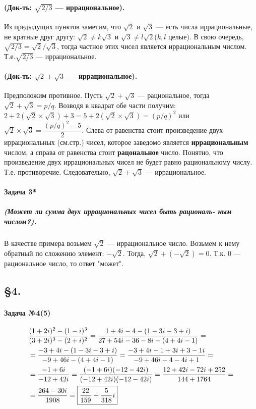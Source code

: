 \documentclass[a4paper,12pt]{report} %
\begin{document}
\paragraph{(Док-ть: $ \sqrt{2/3} $ --- иррациональное).}
Из предыдущих пунктов заметим, что $ \sqrt{2} $ и
$ \sqrt{3} $ --- есть числа иррациональные, 
не кратные друг другу: $ \sqrt{2} \ne k\sqrt{3} $ и
$ \sqrt{3} \ne l\sqrt{2} $($k, l $ целые).
В свою очередь, $ \sqrt{2/3}=\sqrt{2}/\sqrt{3} $, тогда
частное этих чисел является иррациональным числом.
Т.е.$ \sqrt{2/3} $ --- иррациональное.

\paragraph{(Док-ть: $ \sqrt{2} + \sqrt{3} $ --- иррациональное).}
Предположим противное.
Пусть $ \sqrt{2} + \sqrt{3} $ --- рациональное, тогда
$ \sqrt{2} + \sqrt{3} = p/q $. Возводя в квадрат обе части получим: 
$ 2 + 2(\sqrt{2} \times \sqrt{3}) + 3 = 
5 + 2(\sqrt{2} \times \sqrt{3}) = (p/q)^2 $ или 
$ \sqrt{2} \times \sqrt{3} = \dfrac{(p/q)^2 - 5}{2} $.  
Слева от равенства стоит произведение двух иррациональных (см.стр.\pageref{sqrt2}) чисел, которое
заведомо является \textbf{иррациональным} числом,
а справа от равенства стоит \textbf{рацональное} число.
Понятно, что произведение двух иррациональных чисел 
не будет равно рациональному числу. Т.е. противоречие.
Следовательно, $ \sqrt{2} + \sqrt{3} $ --- иррациональное.

\paragraph{Задача 3*}
\subparagraph{(Может ли сумма двух иррациональных чисел быть рациональ-	ным числом?).} 
В качестве примера возьмем $ \sqrt{2} $ --- иррациональное число.
Возьмем к нему обратный по сложению элемент: $ -\sqrt{2} $. Тогда,
$ \sqrt{2} + (-\sqrt{2}) = 0 $. Т.к. 0 --- рациональное число, то 
ответ "может".

\subsection{\S4.\\}

\paragraph{Задача №4(5)}

\begin{align*}
	&\dfrac{(1+2i)^2-(1-i)^3}{(3+2i)^3-(2+i)^2}=
	\dfrac{1+4i-4-(1-3i-3+i)}{27+54i-36-8i-(4+4i-1)}=\\
	&=\dfrac{-3+4i-(1-3i-3+i)}{-9+46i-(4+4i-1)}=
	\dfrac{-3+4i-1+3i+3-1i}{-9+46i-4-4i+1}=\\
	&=\dfrac{-1+6i}{-12+42i}=
	\dfrac{(-1+6i)(-12-42i)}{(-12+42i)(-12-42i)}=
	\dfrac{12+42i-72i+252}{144+1764}=\\
	&=\dfrac{264-30i}{1908}=
	\fbox{$ \dfrac{22}{159}+\dfrac{5}{318}i $} 
\end{align*}
\end{document}
